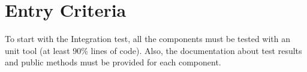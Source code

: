 \documentclass[../../../../testPlan.tex]{subfiles}
\begin{document}
	\section{Entry Criteria}
		To start with the Integration test, all the components must be tested with an unit tool (at least 90\% lines of code). Also, the documentation about test results and public methods must be provided for each component.
\end{document}
